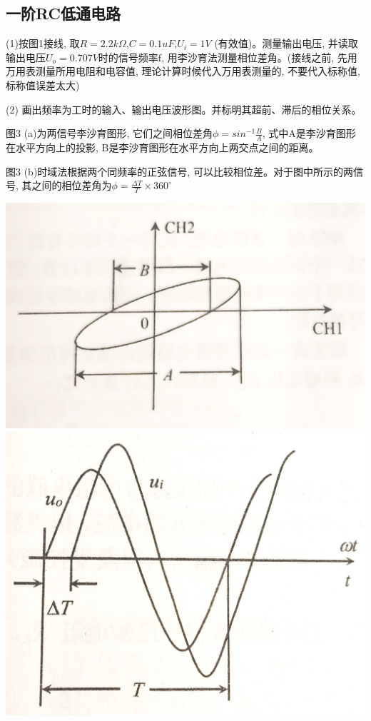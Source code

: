 \documentclass[a4paper]{article}
\begin{document}
    \subsection{一阶RC低通电路}

    {(1)按图1接线, 取$R=2.2k\Omega$,$C=0.1uF$,$U_{i}=1V$ (有效值)。测量输出电压, 并读取输出电压$U_{o}=0.707V$时的信号频率f, 用李沙育法测量相位差角。(接线之前, 先用万用表测量所用电阻和电容值, 理论计算时候代入万用表测量的, 不要代入标称值, 标称值误差太大) }

    {(2) 画出频率为工时的输入、输出电压波形图。并标明其超前、滞后的相位关系。}\label{subsec:rc2}


    {图3 (a)为两信号李沙育图形, 它们之间相位差角$\phi =sin^{-1}\frac{B}{A}$, 式中A是李沙育图形在水平方向上的投影, B是李沙育图形在水平方向上两交点之间的距离。}

    {图3 (b)时域法根据两个同频率的正弦信号, 可以比较相位差。对于图中所示的两信号, 其之间的相位差角为$\phi=\frac{\Delta T}{T} \times 360^{\circ}$}

    \includegraphics[height=0.20\textheight]{3}
    \includegraphics[height=0.21\textheight]{4}
\end{document}
